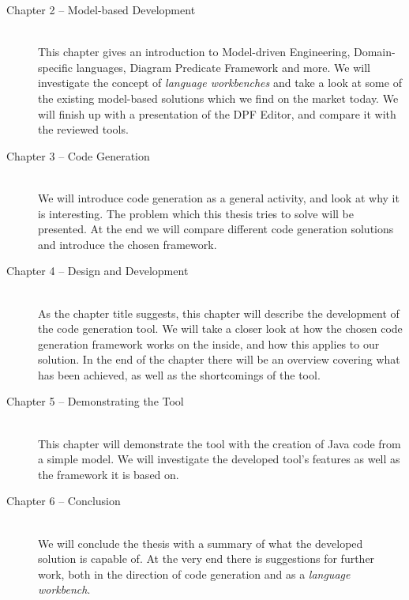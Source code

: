 \begin{description}
\item[Chapter 2 -- Model-based Development] \hfill \\
This chapter gives an introduction to Model-driven Engineering, Domain-specific languages, Diagram Predicate Framework and more. We will investigate the concept of \emph{language workbenches} and take a look at some of the existing model-based solutions which we find on the market today. We will finish up with a presentation of the DPF Editor, and compare it with the reviewed tools.

\item[Chapter 3 -- Code Generation] \hfill \\
We will introduce code generation as a general activity, and look at why it is interesting. The problem which this thesis tries to solve will be presented. At the end we will compare different code generation solutions and introduce the chosen framework.

\item[Chapter 4 -- Design and Development] \hfill \\
As the chapter title suggests, this chapter will describe the development of the code generation tool. We will take a closer look at how the chosen code generation framework works on the inside, and how this applies to our solution. In the end of the chapter there will be an overview covering what has been achieved, as well as the shortcomings of the tool.

\item[Chapter 5 -- Demonstrating the Tool] \hfill \\
This chapter will demonstrate the tool with the creation of Java code from a simple model. We will investigate the developed tool's features as well as the framework it is based on.

\item[Chapter 6 -- Conclusion] \hfill \\
We will conclude the thesis with a summary of what the developed solution is capable of. At the very end there is suggestions for further work, both in the direction of code generation and as a \emph{language workbench}.
\end{description}


